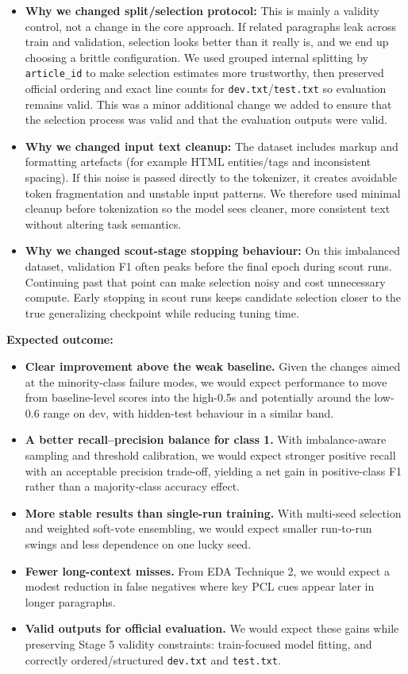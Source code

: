 \documentclass[11pt, a4paper]{article}
\begin{document}
\begin{itemize}
  \item \textbf{Why we changed split/selection protocol:} This is mainly a validity control, not a change in the core approach. If related paragraphs leak across train and validation, selection looks better than it really is, and we end up choosing a brittle configuration. We used grouped internal splitting by \texttt{article\_id} to make selection estimates more trustworthy, then preserved official ordering and exact line counts for \texttt{dev.txt}/\texttt{test.txt} so evaluation remains valid. This was a minor additional change we added to ensure that the selection process was valid and that the evaluation outputs were valid.

  \item \textbf{Why we changed input text cleanup:} The dataset includes markup and formatting artefacts (for example HTML entities/tags and inconsistent spacing). If this noise is passed directly to the tokenizer, it creates avoidable token fragmentation and unstable input patterns. We therefore used minimal cleanup before tokenization so the model sees cleaner, more consistent text without altering task semantics.

  \item \textbf{Why we changed scout-stage stopping behaviour:} On this imbalanced dataset, validation F1 often peaks before the final epoch during scout runs. Continuing past that point can make selection noisy and cost unnecessary compute. Early stopping in scout runs keeps candidate selection closer to the true generalizing checkpoint while reducing tuning time.
\end{itemize}

\textbf{Expected outcome:}
\begin{itemize}
  \item \textbf{Clear improvement above the weak baseline.} Given the changes aimed at the minority-class failure modes, we would expect performance to move from baseline-level scores into the high-0.5s and potentially around the low-0.6 range on dev, with hidden-test behaviour in a similar band.
  \item \textbf{A better recall--precision balance for class 1.} With imbalance-aware sampling and threshold calibration, we would expect stronger positive recall with an acceptable precision trade-off, yielding a net gain in positive-class F1 rather than a majority-class accuracy effect.
  \item \textbf{More stable results than single-run training.} With multi-seed selection and weighted soft-vote ensembling, we would expect smaller run-to-run swings and less dependence on one lucky seed.
  \item \textbf{Fewer long-context misses.} From EDA Technique 2, we would expect a modest reduction in false negatives where key PCL cues appear later in longer paragraphs.
  \item \textbf{Valid outputs for official evaluation.} We would expect these gains while preserving Stage 5 validity constraints: train-focused model fitting, and correctly ordered/structured \texttt{dev.txt} and \texttt{test.txt}.
\end{itemize}
\newpage
\end{document}
